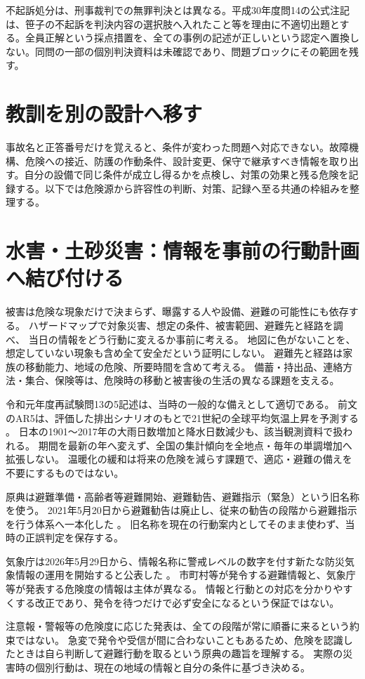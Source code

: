 不起訴処分は、刑事裁判での無罪判決とは異なる。平成30年度問14の公式注記は、笹子の不起訴を判決内容の選択肢へ入れたこと等を理由に不適切出題とする。全員正解という採点措置を、全ての事例の記述が正しいという認定へ置換しない。同問の一部の個別判決資料は未確認であり、問題ブロックにその範囲を残す。

\section{教訓を別の設計へ移す}
事故名と正答番号だけを覚えると、条件が変わった問題へ対応できない。故障機構、危険への接近、防護の作動条件、設計変更、保守で継承すべき情報を取り出す。自分の設備で同じ条件が成立し得るかを点検し、対策の効果と残る危険を記録する。以下では危険源から許容性の判断、対策、記録へ至る共通の枠組みを整理する。
\section{水害・土砂災害：情報を事前の行動計画へ結び付ける}
\label{theory:safety:preparedness}
被害は危険な現象だけで決まらず、曝露する人や設備、避難の可能性にも依存する。
ハザードマップで対象災害、想定の条件、被害範囲、避難先と経路を調べ、
当日の情報をどう行動に変えるか事前に考える。
地図に色がないことを、想定していない現象も含め全て安全だという証明にしない。
避難先と経路は家族の移動能力、地域の危険、所要時間を含めて考える。
備蓄・持出品、連絡方法・集合、保険等は、危険時の移動と被害後の生活の異なる課題を支える。

令和元年度再試験問13の5記述は、当時の一般的な備えとして適切である。
前文のAR5は、評価した排出シナリオのもとで21世紀の全球平均気温上昇を予測する
\cite{env_ar5}。
日本の1901〜2017年の大雨日数増加と降水日数減少も、該当観測資料で扱われる\cite{env_rain2017}。
期間を最新の年へ変えず、全国の集計傾向を全地点・毎年の単調増加へ拡張しない。
温暖化の緩和は将来の危険を減らす課題で、適応・避難の備えを不要にするものではない。

\begin{tcolorbox}[title=出題2019年度と制度改正]
原典は避難準備・高齢者等避難開始、避難勧告、避難指示（緊急）という旧名称を使う。
2021年5月20日から避難勧告は廃止し、従来の勧告の段階から避難指示を行う体系へ一本化した
\cite{env_evac2021}。
旧名称を現在の行動案内としてそのまま使わず、当時の正誤判定を保存する。
\end{tcolorbox}

\begin{tcolorbox}[title=2026年の防災気象情報]
気象庁は2026年5月29日から、情報名称に警戒レベルの数字を付す新たな防災気象情報の運用を開始すると公表した
\cite{env_warning2026}。
市町村等が発令する避難情報と、気象庁等が発表する危険度の情報は主体が異なる。
情報と行動との対応を分かりやすくする改正であり、発令を待つだけで必ず安全になるという保証ではない。
\end{tcolorbox}
注意報・警報等の危険度に応じた発表は、全ての段階が常に順番に来るという約束ではない。
急変で発令や受信が間に合わないこともあるため、危険を認識したときは自ら判断して避難行動を取るという原典の趣旨を理解する。
実際の災害時の個別行動は、現在の地域の情報と自分の条件に基づき決める。
